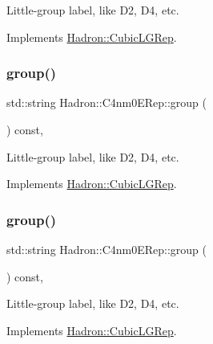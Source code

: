 Little-\/group label, like D2, D4, etc. 

Implements \mbox{\hyperlink{structHadron_1_1CubicLGRep_a9bdb14b519a611d21379ed96a3a9eb41}{Hadron\+::\+Cubic\+L\+G\+Rep}}.

\mbox{\label{structHadron_1_1C4nm0ERep_a0d17268ef31fa011daabf7af62deec34}} 
\subsubsection{\texorpdfstring{group()}{group()}\hspace{0.1cm}{\footnotesize\ttfamily [2/3]}}
{\footnotesize\ttfamily std\+::string Hadron\+::\+C4nm0\+E\+Rep\+::group (\begin{DoxyParamCaption}{ }\end{DoxyParamCaption}) const\hspace{0.3cm}{\ttfamily [inline]}, {\ttfamily [virtual]}}

Little-\/group label, like D2, D4, etc. 

Implements \mbox{\hyperlink{structHadron_1_1CubicLGRep_a9bdb14b519a611d21379ed96a3a9eb41}{Hadron\+::\+Cubic\+L\+G\+Rep}}.

\mbox{\label{structHadron_1_1C4nm0ERep_a0d17268ef31fa011daabf7af62deec34}} 
\subsubsection{\texorpdfstring{group()}{group()}\hspace{0.1cm}{\footnotesize\ttfamily [3/3]}}
{\footnotesize\ttfamily std\+::string Hadron\+::\+C4nm0\+E\+Rep\+::group (\begin{DoxyParamCaption}{ }\end{DoxyParamCaption}) const\hspace{0.3cm}{\ttfamily [inline]}, {\ttfamily [virtual]}}

Little-\/group label, like D2, D4, etc. 

Implements \mbox{\hyperlink{structHadron_1_1CubicLGRep_a9bdb14b519a611d21379ed96a3a9eb41}{Hadron\+::\+Cubic\+L\+G\+Rep}}.

\mbox{\label{structHadron_1_1C4nm0ERep_a7f4628e8d080d5552176c65fcbd66e84}} 
